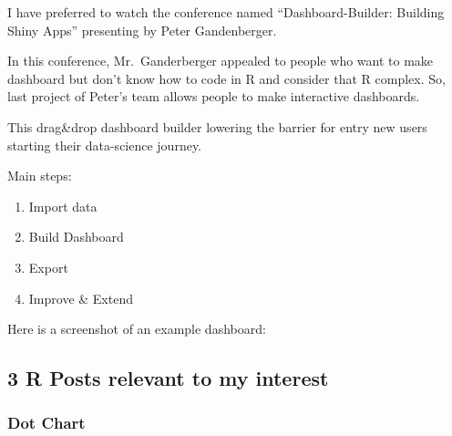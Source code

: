 \documentclass[
]{article}
\providecommand{\tightlist}{%
  \setlength{\itemsep}{0pt}\setlength{\parskip}{0pt}}
\begin{document}
I have preferred to watch the conference named ``Dashboard-Builder:
Building Shiny Apps'' presenting by Peter Gandenberger.

In this conference, Mr.~Ganderberger appealed to people who want to make
dashboard but don't know how to code in R and consider that R complex.
So, last project of Peter's team allows people to make interactive
dashboards.

This drag\&drop dashboard builder lowering the barrier for entry new
users starting their data-science journey.

Main steps:

\begin{enumerate}
\def\labelenumi{\arabic{enumi}.}
\tightlist
\item
  Import data
\item
  Build Dashboard
\item
  Export
\item
  Improve \& Extend
\end{enumerate}

Here is a screenshot of an example dashboard:

\hypertarget{r-posts-relevant-to-my-interest}{%
\subsection{3 R Posts relevant to my
interest}\label{r-posts-relevant-to-my-interest}}

\hypertarget{dot-chart}{%
\subsubsection{Dot Chart}\label{dot-chart}}
\end{document}
